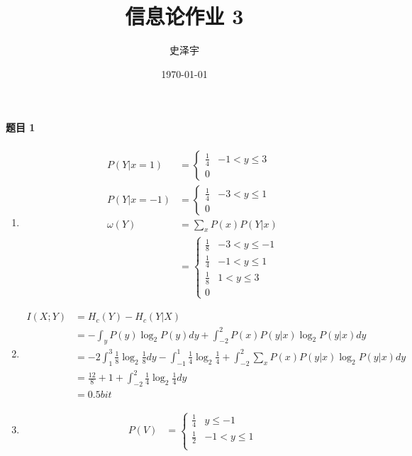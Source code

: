 \documentclass{ctexart}
\title{信息论作业 3}
\author{史泽宇}
\date{\today}
\begin{document}
\maketitle

\paragraph{题目 1}

\begin{enumerate}
    \item\begin{align}
        P(Y|x=1) &= \begin{cases}
            \frac{1}{4} & -1 < y \le 3 \\
            0 &
        \end{cases} \\
        P(Y|x=-1) &= \begin{cases}
            \frac{1}{4} & -3 < y \le 1 \\
            0 &
        \end{cases} \\
        \omega(Y) &= \sum_x P(x)P(Y|x) \\
        &= \begin{cases}
            \frac{1}{8} & -3 < y \le -1 \\
            \frac{1}{4} & -1 < y \le 1 \\
            \frac{1}{8} & 1 < y \le 3 \\
            0 &
        \end{cases}
    \end{align}
    \item\begin{align}
        I(X; Y) &= H_c(Y) - H_c(Y|X) \\
        &= -\int_y P(y)\log_2 P(y)dy + \int_{-2}^2 P(x)P(y|x)\log_2 P(y|x)dy \\
        &= -2\int_1^3\frac{1}{8}\log_2\frac{1}{8}dy - \int_{-1}^1\frac{1}{4}\log_2\frac{1}{4} + \int_{-2}^2\sum_x P(x)P(y|x)\log_2 P(y|x)dy \\
        &= \frac{12}{8} + 1 + \int_{-2}^2 \frac{1}{4}\log_2\frac{1}{4}dy \\
        &= 0.5 bit
    \end{align}
    \item\begin{align}
        P(V) &= \begin{cases}
            \frac{1}{4} & y \le -1 \\
            \frac{1}{2} & -1 < y \le 1 \\

\end{cases}
\end{align}
\end{enumerate}
\end{document}
